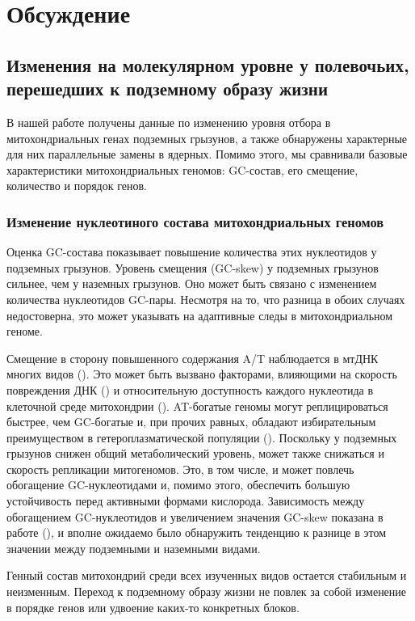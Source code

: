 \chapter{Обсуждение} \label{discussion}

\section{Изменения на молекулярном уровне у полевочьих, перешедших к подземному образу жизни}

В нашей работе получены данные по изменению уровня отбора в митохондриальных генах подземных грызунов, а также обнаружены характерные для них параллельные замены в ядерных. Помимо этого, мы сравнивали базовые характеристики митохондриальных геномов: GC-состав, его смещение, количество и порядок генов. 

\subsection{Изменение нуклеотиного состава митохондриальных геномов}

Оценка GC-состава показывает повышение количества этих нуклеотидов у подземных грызунов. Уровень смещения (GC-skew) у подземных грызунов сильнее, чем у наземных грызунов. Оно может быть связано с изменением количества нуклеотидов GC-пары. Несмотря на то, что разница в обоих случаях недостоверна, это может указывать на адаптивные следы в митохондриальном геноме. 

Смещение в сторону повышенного содержания A/T наблюдается в мтДНК многих видов (\cite{Ballard2004}). Это может быть вызвано факторами, влияющими на скорость повреждения ДНК (\cite{Martin1995}) и относительную доступность каждого нуклеотида в клеточной среде митохондрии (\cite{Xia1996}). AT-богатые геномы могут реплицироваться быстрее, чем GC-богатые и, при прочих равных, обладают избирательным преимуществом в гетероплазматической популяции (\cite{Ballard2000}). Поскольку у подземных грызунов снижен общий метаболический уровень, может также снижаться и скорость репликации митогеномов. Это, в том числе, и может повлечь обогащение GC-нуклеотидами и, помимо этого, обеспечить большую устойчивость перед активными формами кислорода. Зависимость между обогащением GC-нуклеотидов и увеличением значения GC-skew показана в работе (\cite{Saccone2000}), и вполне ожидаемо было обнаружить тенденцию к разнице в этом значении между подземными и наземными видами. 

Генный состав митохондрий среди всех изученных видов остается стабильным и неизменным. Переход к подземному образу жизни не повлек за собой изменение в порядке генов или удвоение каких-то конкретных блоков. 

